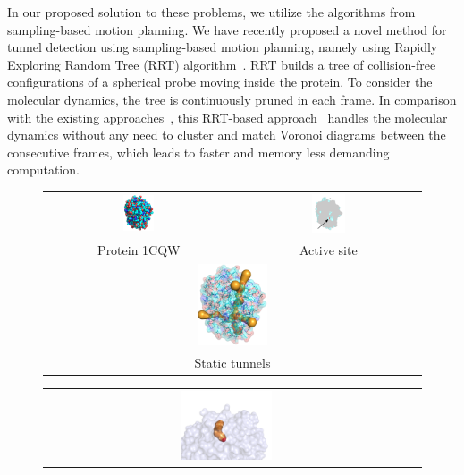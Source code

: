 \documentclass[usletter, 10pt, conference]{svjour3}      %
\begin{document}
In our proposed solution to these problems, we utilize the algorithms from sampling-based motion planning.
We have recently proposed a novel method for tunnel detection using sampling-based motion planning, namely using Rapidly Exploring Random Tree (RRT) algorithm~\cite{vonasek2017tunnel}.
RRT builds a tree of collision-free configurations of a spherical probe moving inside the protein. 
To consider the molecular dynamics, the tree is continuously pruned in each frame.
In comparison with the existing approaches~\cite{Petrek20071357,petrek2006caver}, this RRT-based approach~\cite{vonasek2016application} 
handles the molecular dynamics without any need to cluster and match Voronoi diagrams between the consecutive frames, which leads to faster and memory less demanding computation.


\begin{figure}[t]
\centering
{\footnotesize
\renewcommand{\arraystretch}{0.1}
\renewcommand{\tabcolsep}{0pt}
\begin{tabular}{cc}
\includegraphics[width=0.17\textwidth]{fig/motiv1} &
\includegraphics[width=0.19\textwidth]{fig/motiv2lab} \\
Protein 1CQW & Active site \\
\multicolumn{2}{c}{\includegraphics[width=0.19\textwidth]{fig/motiv3}} \\
\multicolumn{2}{c}{Static tunnels }
\end{tabular}
\begin{tabular}{cc}
\includegraphics[width=0.26\textwidth]{fig/dt-f5} &

\end{tabular}}
\end{figure}
\end{document}
